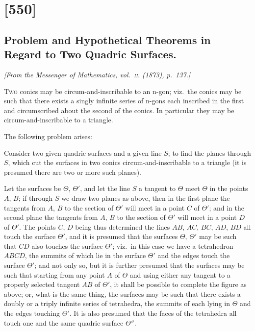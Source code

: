 \documentclass[11pt,a4paper]{book}
\begin{document}
\section{[550]}
\subsection{Problem and Hypothetical Theorems in Regard to Two Quadric Surfaces.}

\begin{center}
\textit{[From the Messenger of Mathematics, vol.~\textsc{ii}. (1873), p.~137.]}
\end{center}

\textsc{Two} conics may be circum-and-inscribable to an n-gon; viz.\ the conics may be
such that there exists a singly infinite series of n-gons each inscribed in the first and
circumscribed about the second of the conics.  In particular they may be circum-and-inscribable to a triangle.

The following problem arises:

Consider two given quadric surfaces and a given line $S$; to find the planes through
$S$, which cut the surfaces in two conics circum-and-inscribable to a triangle (it is
presumed there are two or more such planes).

Let the surfaces be $\Theta$, $\Theta'$, and let the line $S$ a tangent to $\Theta$ meet $\Theta$ in the
points $A$, $B$; if through $S$ we draw two planes as above, then in the first plane the
tangents from $A$, $B$ to the section of $\Theta'$ will meet in a point $C$ of $\Theta'$; and in the
second plane the tangents from $A$, $B$ to the section of $\Theta'$ will meet in a point $D$
of $\Theta'$. The points $C$, $D$ being thus determined the lines $AB$, $AC$, $BC$, $AD$, $BD$ all
touch the surface $\Theta'$, and it is presumed that the surfaces $\Theta$, $\Theta'$ may be such that
$CD$ also touches the surface $\Theta'$; viz.\ in this case we have a tetrahedron $ABCD$, the
summits of which lie in the surface $\Theta'$ and the edges touch the surface $\Theta'$; and not
only so, but it is further presumed that the surfaces may be such that starting from
any point $A$ of $\Theta$ and using either any tangent to a properly selected tangent $AB$
of $\Theta'$, it shall be possible to complete the figure as above; or, what is the same thing,
the surfaces may be such that there exists a doubly or a triply infinite series of
tetrahedra, the summits of each lying in $\Theta$ and the edges touching $\Theta'$. It is also
presumed that the faces of the tetrahedra all touch one and the same quadric surface $\Theta''$.
\end{document}
